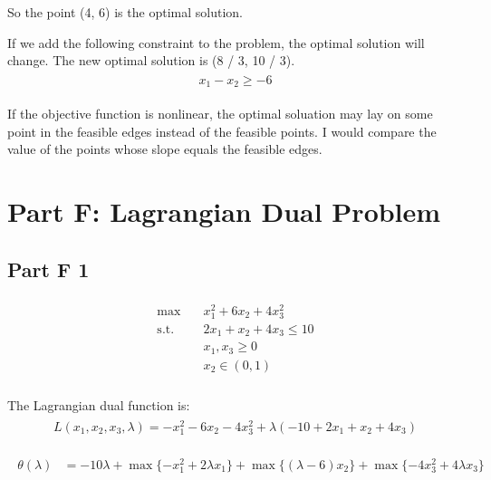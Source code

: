 \documentclass[fleqn,10pt]{wlscirep}
\begin{document}
So the point (4, 6) is the optimal solution.

If we add the following constraint to the problem, the optimal solution will change. The new optimal solution is (8 / 3, 10 / 3).
\begin{align} \begin{split}
    x_{1} - x_{2} \geq - 6
\end{split} \end{align} 

If the objective function is nonlinear, the optimal soluation may lay on some point in the feasible edges instead of the feasible points. I would compare the value of the points whose slope equals the feasible edges.

\section{Part F: Lagrangian Dual Problem}

\subsection{Part F 1}

\begin{align} \begin{split}
    \max \quad & x_{1}^{2} + 6 x_{2} + 4 x_{3}^{2} \\
    \text{s.t.} \quad & 2 x_{1} + x_{2} + 4 x_{3} \leq 10 \\ 
    & x_{1}, x_{3} \geq 0 \\ 
    & x_{2} \in (0, 1) \\
\end{split} \end{align} 

The Lagrangian dual function is:
\begin{align} \begin{split}
    L(x_{1}, x_{2}, x_{3}, \lambda) = - x_{1}^{2} - 6 x_{2} - 4 x_{3}^{2} + \lambda (- 10 + 2 x_{1} + x_{2} + 4 x_{3} )
\end{split} \end{align} 

\begin{align} \begin{split}
    \theta(\lambda) &= - 10 \lambda + \max\{- x_{1}^{2} + 2 \lambda x_{1} \} + \max\{(\lambda - 6) x_{2} \} + \max\{- 4 x_{3}^{2} + 4 \lambda x_{3} \}
\end{split} \end{align} 
\end{document}
